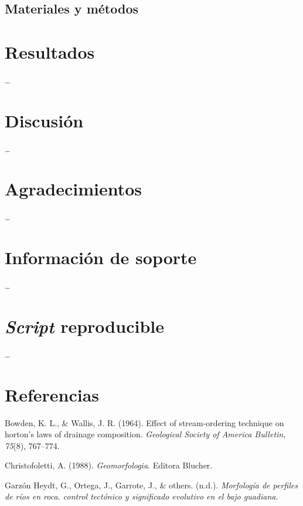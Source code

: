 \documentclass[11pt,]{article}
\begin{document}
\subsection{Materiales y métodos}\label{materiales-y-muxe9todos}

\section{Resultados}\label{resultados}

\ldots

\section{Discusión}\label{discusiuxf3n}

\ldots

\section{Agradecimientos}\label{agradecimientos}

\ldots

\section{Información de soporte}\label{informaciuxf3n-de-soporte}

\ldots

\section{\texorpdfstring{\emph{Script}
reproducible}{Script reproducible}}\label{script-reproducible}

\ldots

\section*{Referencias}\label{referencias}

\hypertarget{refs}{}
\hypertarget{ref-bowden1964effect}{}
Bowden, K. L., \& Wallis, J. R. (1964). Effect of stream-ordering
technique on horton's laws of drainage composition. \emph{Geological
Society of America Bulletin}, \emph{75}(8), 767--774.

\hypertarget{ref-christofoletti1988geomorfologia}{}
Christofoletti, A. (1988). \emph{Geomorfologia}. Editora Blucher.

\hypertarget{ref-garzonmorfologia}{}
Garzón Heydt, G., Ortega, J., Garrote, J., \& others. (n.d.).
\emph{Morfología de perfiles de ríos en roca. control tectónico y
significado evolutivo en el bajo guadiana}.
\end{document}
